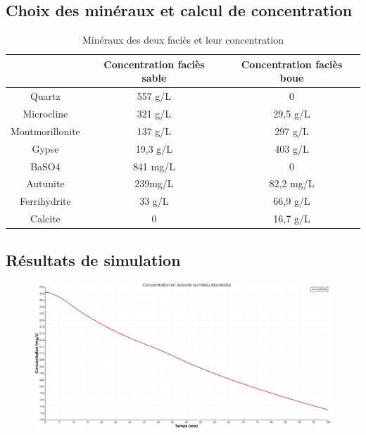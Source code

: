 \documentclass{article}
\begin{document}
\subsection{Choix des minéraux et calcul de concentration}
\begin{table}[H]
    \centering    
    \caption{Minéraux des deux faciès et leur concentration }
    \begin{tabular}{ |c |c |c |}
        \hline
         \textbf & \textbf{Concentration faciès sable} & \textbf{Concentration faciès boue}\\ 
         \hline
         Quartz & 557 g/L & 0 \\ 
         \hline
         Microcline & 321 g/L & 29,5 g/L  \\
         \hline
         Montmorillonite & 137 g/L & 297 g/L  \\
         \hline
         Gypse & 19,3 g/L & 403 g/L  \\
         \hline
         BaSO4 & 841 mg/L & 0  \\
          \hline
         Autunite & 239mg/L & 82,2 mg/L  \\
          \hline
         Ferrihydrite & 33 g/L & 66,9 g/L  \\
          \hline
         Calcite & 0 & 16,7 g/L \\
         \hline
    \end{tabular}

    \label{tab:mineraux_concentrations}
\end{table}

\subsection{Résultats de simulation}

\begin{figure}[H]
    \centering
    \includegraphics[width=0.5\linewidth]{III_B_2_2.png}
    \caption{}
    \label{fig:annexe_autunite_residus_sable_base}
\end{figure}
\end{document}

